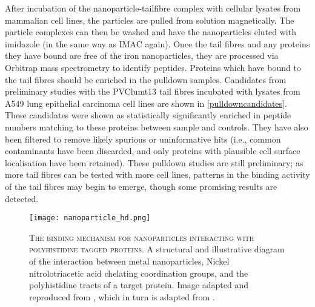 After incubation of the nanoparticle-tailfibre complex with cellular lysates from mammalian cell lines, the particles are pulled from solution magnetically. The particle complexes can then be washed and have the nanoparticles eluted with imidazole (in the same way as IMAC again). Once the tail fibres and any proteins they have bound are free of the iron nanoparticles, they are processed via Orbitrap mass spectrometry to identify peptides. Proteins which have bound to the tail fibres should be enriched in the pulldown samples. Candidates from preliminary studies with the PVClumt13 tail fibres incubated with lysates from A549 lung epithelial carcinoma cell lines are shown in \vref{pulldowncandidates}. These candidates were shown as statistically significantly enriched in peptide numbers matching to these proteins between sample and controls. They have also been filtered to remove likely spurious or uninformative hits (i.e., common contaminants have been discarded, and only proteins with plausible cell surface localisation have been retained). These pulldown studies are still preliminary; as more tail fibres can be tested with more cell lines, patterns in the binding activity of the tail fibres may begin to emerge, though some promising results are detected.


\begin{figure}[h]
\centering
    \texttt{[image: nanoparticle\_hd.png]}
	\captionsetup{singlelinecheck=off, justification=justified, font=footnotesize, aboveskip=10pt}
	\caption[Dynabead particle interactions]{\textsc{\normalsize The binding mechanism for nanoparticles interacting with polyhistidine tagged proteins.}\vspace{0.1cm} \newline A structural and illustrative diagram of the interaction between metal nanoparticles, Nickel nitrolotriacetic acid chelating coordination groups, and the polyhistidine tracts of a target protein. Image adapted and reproduced from \cite{Sperling2010}, which in turn is adapted from \cite{Hainfeld1999}.}
\label{nanoparticle}
\end{figure}


